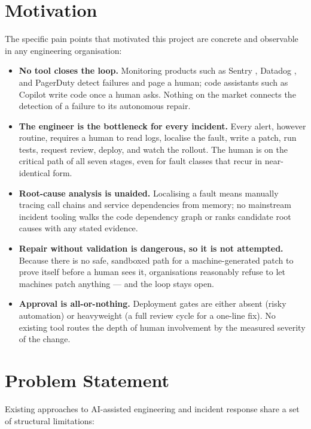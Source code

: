 \section{Motivation}

The specific pain points that motivated this project are concrete and
observable in any engineering organisation:

\begin{itemize}
  \item \textbf{No tool closes the loop.} Monitoring products such as Sentry
    \cite{sentry}, Datadog \cite{datadog}, and PagerDuty \cite{pagerduty}
    detect failures and page a human; code assistants such as Copilot
    \cite{copilot} write code once a human asks. Nothing on the market
    connects the detection of a failure to its autonomous repair.
  \item \textbf{The engineer is the bottleneck for every incident.} Every
    alert, however routine, requires a human to read logs, localise the
    fault, write a patch, run tests, request review, deploy, and watch the
    rollout. The human is on the critical path of all seven stages, even
    for fault classes that recur in near-identical form.
  \item \textbf{Root-cause analysis is unaided.} Localising a fault means
    manually tracing call chains and service dependencies from memory; no
    mainstream incident tooling walks the code dependency graph or ranks
    candidate root causes with any stated evidence.
  \item \textbf{Repair without validation is dangerous, so it is not
    attempted.} Because there is no safe, sandboxed path for a
    machine-generated patch to prove itself before a human sees it,
    organisations reasonably refuse to let machines patch anything --- and
    the loop stays open.
  \item \textbf{Approval is all-or-nothing.} Deployment gates are either
    absent (risky automation) or heavyweight (a full review cycle for a
    one-line fix). No existing tool routes the depth of human involvement
    by the measured severity of the change.
\end{itemize}

\section{Problem Statement}

Existing approaches to AI-assisted engineering and incident response share a
set of structural limitations:

